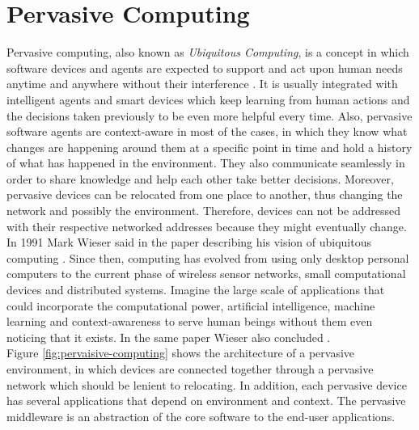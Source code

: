 \section{Pervasive Computing} 
 Pervasive computing, also known as \textit{Ubiquitous Computing}, is a concept in which software devices and agents are expected to support and act upon human needs anytime and anywhere without their interference \cite{Chen:2003:OCP:991804.991806}. It is usually integrated with intelligent agents and smart devices which keep learning from human actions and the decisions taken previously to be even more helpful every time. Also, pervasive software agents are context-aware in most of the cases, in which they know what changes are happening around them at a specific point in time and hold a history of what has happened in the environment. They also communicate seamlessly in order to share knowledge and help each other take better decisions. Moreover, pervasive devices can be relocated from one place to another, thus changing the network and possibly the environment. Therefore, devices can not be addressed with their respective networked addresses because they might eventually change. \\

\noindent In 1991 Mark Wieser said in the paper describing his vision of ubiquitous computing   \cite{weiser1991ubicomp}. Since then, computing has evolved from using only desktop personal computers to the current phase of wireless sensor networks, small computational devices and distributed systems. Imagine the large scale of applications that could incorporate the computational power, artificial intelligence, machine learning and context-awareness to serve human beings without them even noticing that it exists. In the same paper Wieser also concluded .\\



\noindent Figure \ref{fig:pervaisive-computing} shows the architecture of a pervasive environment, in which devices are connected together through a pervasive network which should be lenient to relocating. In addition, each pervasive device has several applications that depend on environment and  context. The pervasive middleware is an abstraction of the core software to the end-user applications.


